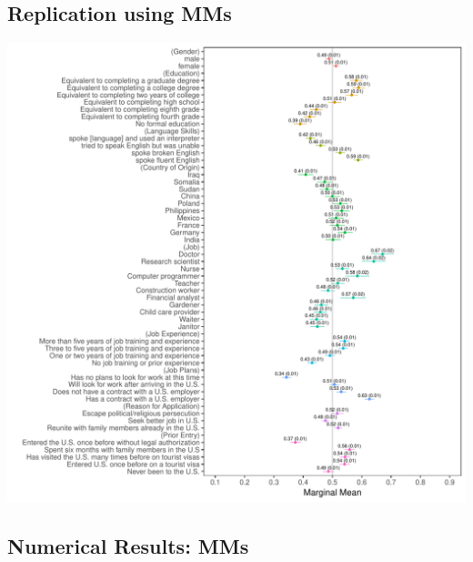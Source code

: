 \documentclass[a4paper,12pt]{article}\usepackage[]{graphicx}\usepackage[]{color}
\makeatletter
\def\maxwidth{ %
  \ifdim\Gin@nat@width>\linewidth
    \linewidth
  \else
    \Gin@nat@width
  \fi
}
\newenvironment{knitrout}{}{} %
\makeatother
\begin{document}
\clearpage

\subsection{Replication using MMs}


\begin{knitrout}
\color{fgcolor}
\includegraphics[width=\maxwidth]{figure/hainmueller_immigration_mm_appendix-1} 

\end{knitrout}

\clearpage

\subsection{Numerical Results: MMs}
\end{document}
